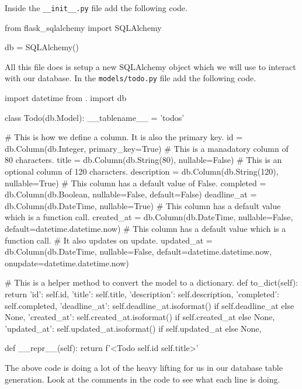 \documentclass{csse4400}
\begin{document}
Inside the \texttt{\_\_init\_\_.py} file add the following code.

\begin{code}[language=python,numbers=none]{}
  from flask_sqlalchemy import SQLAlchemy

  db = SQLAlchemy()
\end{code}

All this file does is setup a new SQLAlchemy object which we will use to interact with our database.
In the \texttt{models/todo.py} file add the following code.

\begin{code}[language=python,numbers=none]{}
import datetime
from . import db

class Todo(db.Model):
    __tablename__ = 'todos'

    # This is how we define a column. It is also the primary key.
    id = db.Column(db.Integer, primary_key=True)
    # This is a manadatory column of 80 characters.
    title = db.Column(db.String(80), nullable=False)
    # This is an optional column of 120 characters.
    description = db.Column(db.String(120), nullable=True)
    # This column has a default value of False.
    completed = db.Column(db.Boolean, nullable=False, default=False)
    deadline_at = db.Column(db.DateTime, nullable=True)
    # This column has a default value which is a function call.
    created_at = db.Column(db.DateTime, nullable=False, default=datetime.datetime.now)
    # This column has a default value which is a function call.
    # It also updates on update.
    updated_at = db.Column(db.DateTime, nullable=False,
                             default=datetime.datetime.now,
                             onupdate=datetime.datetime.now)
    
    # This is a helper method to convert the model to a dictionary.
    def to_dict(self):
        return {
            'id': self.id,
            'title': self.title,
            'description': self.description,
            'completed': self.completed,
            'deadline_at': self.deadline_at.isoformat() if self.deadline_at else None,
            'created_at': self.created_at.isoformat() if self.created_at else None,
            'updated_at': self.updated_at.isoformat() if self.updated_at else None,
        }

    def __repr__(self):
        return f'<Todo {self.id} {self.title}>'
\end{code}

The above code is doing a lot of the heavy lifting for us in our database table generation.
Look at the comments in the code to see what each line is doing.
\end{document}
